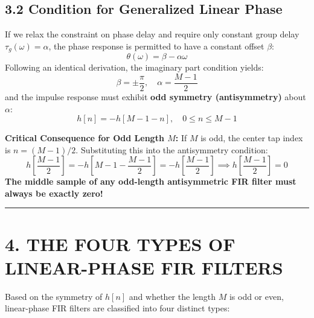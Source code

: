 \documentclass[11pt,a4paper]{article}
\begin{document}
\subsection{3.2 Condition for Generalized Linear Phase}
If we relax the constraint on phase delay and require only constant group delay $\tau_g(\omega) = \alpha$, the phase response is permitted to have a constant offset $\beta$:
\begin{equation}
\theta(\omega) = \beta - \alpha \omega
\end{equation}
Following an identical derivation, the imaginary part condition yields:
\begin{equation}
\beta = \pm \frac{\pi}{2}, \quad \alpha = \frac{M-1}{2}
\end{equation}
and the impulse response must exhibit \textbf{odd symmetry (antisymmetry)} about $\alpha$:
\begin{equation}
h[n] = -h[M - 1 - n], \quad 0 \le n \le M - 1
\end{equation}

\noindent\textbf{Critical Consequence for Odd Length $M$:}
If $M$ is odd, the center tap index is $n = (M-1)/2$. Substituting this into the antisymmetry condition:
\begin{equation}
h\left[\frac{M-1}{2}\right] = -h\left[M - 1 - \frac{M-1}{2}\right] = -h\left[\frac{M-1}{2}\right] \implies h\left[\frac{M-1}{2}\right] = 0
\end{equation}
\textbf{The middle sample of any odd-length antisymmetric FIR filter must always be exactly zero!}

\noindent\rule{\textwidth}{0.5pt}

\section{4. THE FOUR TYPES OF LINEAR-PHASE FIR FILTERS}

Based on the symmetry of $h[n]$ and whether the length $M$ is odd or even, linear-phase FIR filters are classified into four distinct types:
\end{document}
